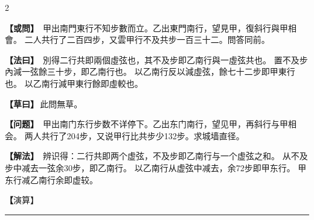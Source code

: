 \documentclass[11pt,a4paper]{article}
\newcommand{\longline}{\noindent\rule{\textwidth}{0.4pt}}
\newcommand{\clOWEN}[1]{%
  \par\vspace{0.3em}%
  \noindent\textcolor{problemcolor}{\textbf{【或問】}}\,{\tradfont #1}\par\nopagebreak%
}
\newcommand{\mdOWEN}[1]{%
  \par\vspace{0.3em}%
  \noindent\textcolor{problemcolor}{\textbf{【问题】}}\,{\modfont #1}\par\nopagebreak%
}
\newcommand{\clFAYUE}[1]{%
  \par\noindent\textcolor{methodcolor}{\textbf{【法曰】}}\,{\tradfont #1}\par\nopagebreak%
}
\newcommand{\mdFAYUE}[1]{%
  \par\noindent\textcolor{methodcolor}{\textbf{【解法】}}\,{\modfont #1}\par\nopagebreak%
}
\newcommand{\clTSAOYUE}[1]{%
  \par\noindent\textcolor{workcolor}{\textbf{【草曰】}}\,{\tradfont #1}\par%
}
\newcommand{\mdTSAOYUE}[1]{%
  \par\noindent\textcolor{workcolor}{\textbf【演算】}}\,{\modfont #1}\par%
\begin{document}
\begin{paracol}{2}

\begin{leftcolumn}
\clOWEN{%
甲出南門東行不知步數而立。乙出東門南行，望見甲，復斜行與甲相會。
二人共行了二百四步，又雲甲行不及共步一百三十二。問答同前。}

\clFAYUE{%
別得二行共即兩個虛弦也，其不及步即乙南行與一虛弦共也。
置不及步內減一弦餘三十步，即乙南行也。
以乙南行反以減虛弦，餘七十二步即甲東行也。
以乙南行減甲東行餘即虛較也。}

\clTSAOYUE{此問無草。}
\end{leftcolumn}

\switchcolumn

\begin{rightcolumn}
\mdOWEN{%
甲出南门东行步数不详停下。乙出东门南行，望见甲，再斜行与甲相会。
两人共行了204步，又说甲行比共步少132步。求城墙直径。}

\mdFAYUE{%
辨识得：二行共即两个虚弦，不及步即乙南行与一个虚弦之和。
从不及步中减去一弦余30步，即乙南行。
以乙南行从虚弦中减去，余72步即甲东行。
甲东行减乙南行余即虚较。}

\mdTSAOYUE{此题无演算草文。}
\end{rightcolumn}

\end{paracol}

\vspace{0.3cm}
\begin{center}\longline\end{center}
\end{document}
